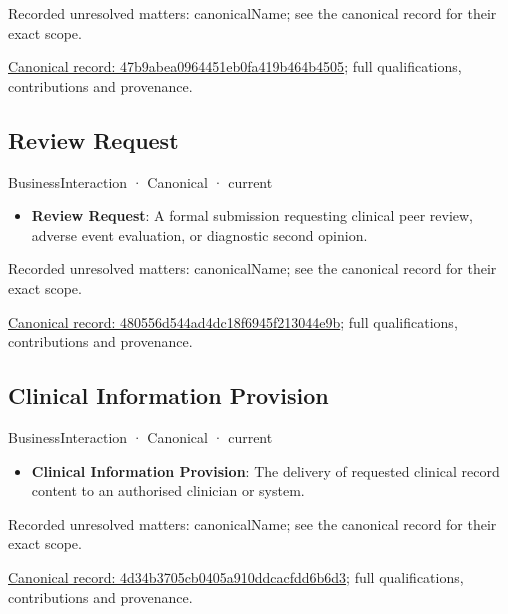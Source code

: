 {\small Recorded unresolved matters: canonicalName; see the canonical record for their exact scope.}\par
{\footnotesize \href{../../../../continuum/business/business-interaction/47b9abea0964451eb0fa419b464b4505.md}{Canonical record: 47b9abea0964451eb0fa419b464b4505}; full qualifications, contributions and provenance.}\par
\subsection{Review Request}

\label{element:480556d544ad4dc18f6945f213044e9b}
{\small BusinessInteraction · Canonical · current}\par

\begin{itemize}


\item \textbf{Review Request}: A formal submission requesting clinical peer review, adverse event evaluation, or diagnostic second opinion.

\end{itemize}

{\small Recorded unresolved matters: canonicalName; see the canonical record for their exact scope.}\par
{\footnotesize \href{../../../../continuum/business/business-interaction/480556d544ad4dc18f6945f213044e9b.md}{Canonical record: 480556d544ad4dc18f6945f213044e9b}; full qualifications, contributions and provenance.}\par
\subsection{Clinical Information Provision}

\label{element:4d34b3705cb0405a910ddcacfdd6b6d3}
{\small BusinessInteraction · Canonical · current}\par

\begin{itemize}


\item \textbf{Clinical Information Provision}: The delivery of requested clinical record content to an authorised clinician or system.

\end{itemize}

{\small Recorded unresolved matters: canonicalName; see the canonical record for their exact scope.}\par
{\footnotesize \href{../../../../continuum/business/business-interaction/4d34b3705cb0405a910ddcacfdd6b6d3.md}{Canonical record: 4d34b3705cb0405a910ddcacfdd6b6d3}; full qualifications, contributions and provenance.}\par
